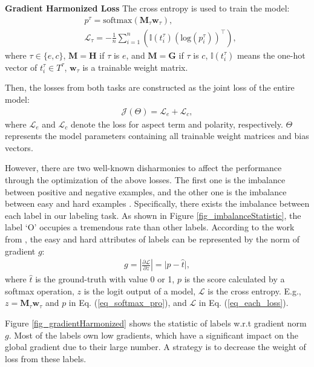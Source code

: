 \documentclass[11pt,a4paper]{article}
\begin{document}
\noindent
\textbf{Gradient Harmonized Loss}\quad
The cross entropy is used to train the model:
\begin{align}
	&p^\tau= \textrm{softmax}(\mathbf{M}_{\tau}\mathbf{w}_\tau), \label{eq_softmax_pro} \\
	&\mathcal{L}_\tau = -\frac{1}{n}\sum_{i=1}^n \left( \mathbb{I} \left(t_i^\tau \right) \left( \text{log} \left(p^\tau_i \right) \right)^\top \right), \label{eq_each_loss}
\end{align}
where $\tau \in \{e,c\}$, $\mathbf{M}=\mathbf{H}$ if $\tau$ is $e$, and $\mathbf{M}=\mathbf{G}$ if $\tau$ is $c$, $\mathbb{I}(t_i^\tau)$ means the one-hot vector of $t_i^\tau \in T^\tau$, $\mathbf{w}_\tau$ is a trainable weight matrix. 

Then, the losses from both tasks are constructed as the joint loss of the entire model:
\begin{align}
    \mathcal{J}(\Theta) = \mathcal{L}_e + \mathcal{L}_c,
\end{align}
where $\mathcal{L}_e$ and $\mathcal{L}_c$ denote the loss for aspect term and polarity, respectively. $\Theta$ represents the model parameters containing all trainable weight matrices and bias vectors. 

However, there are two well-known disharmonies to affect the performance through the optimization of the above losses. The first one is the imbalance between positive and negative examples, and the other one is the imbalance between easy and hard examples \cite{Li2019}. Specifically, there exists the imbalance between each label in our labeling task. As shown in Figure \ref{fig_imbalanceStatistic}, the label `O' occupies a tremendous rate than other labels. According to the work from \citet{Li2019}, the easy and hard attributes of labels can be represented by the norm of gradient $g$:
\begin{align}
    g= \left| \frac{\partial \mathcal{L}}{\partial z} \right| = \vert p - \hat{t} \vert, \label{eq_cal_gradient}
\end{align}
where $\hat{t}$ is the ground-truth with value 0 or 1, $p$ is the score calculated by a softmax operation, $z$ is the logit output of a model, $\mathcal{L}$ is the cross entropy. E.g., $z=\mathbf{M}_{\tau}\mathbf{w}_\tau$ and $p$ in Eq. (\ref{eq_softmax_pro}), and $\mathcal{L}$ in Eq. (\ref{eq_each_loss}).

Figure \ref{fig_gradientHarmonized} shows the statistic of labels w.r.t gradient norm $g$. Most of the labels own low gradients, which have a significant impact on the global gradient due to their large number. A strategy is to decrease the weight of loss from these labels.
\end{document}
